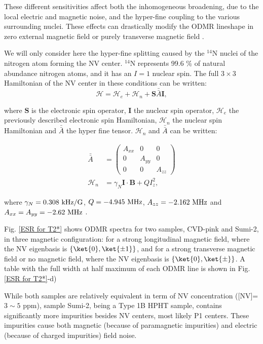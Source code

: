 \documentclass[a4paper,11pt]{report}
\begin{document}
These different sensitivities affect both the inhomogeneous broadening, due to the local electric and magnetic noise, and the hyper-fine coupling to the various surrounding nuclei. These effects can drastically modify the ODMR lineshape in zero external magnetic field \citep{jamonneau2016competition} or purely transverse magnetic field \citep{qiu2021nuclear,qiu2022nanoscale}.

We will only consider here the hyper-fine splitting caused by the $^{14}$N nuclei of the nitrogen atom forming the NV center. $^{14}$N represents 99.6 \% of natural abundance nitrogen atoms, and it has an $I=1$ nuclear spin. The full $3\times 3$ Hamiltonian of the NV center in these conditions can be written:
\begin{equation}
\mathcal{H}=\mathcal{H}_e + \mathcal{H}_n + \mathbf{S} \bar{\bar{A}} \mathbf{I},
\end{equation}

where $\mathbf{S}$ is the electronic spin operator, $\mathbf{I}$ the nuclear spin operator, $\mathcal{H}_e$ the previously described electronic spin Hamiltonian, $\mathcal{H}_n$ the nuclear spin Hamiltonian and $\bar{\bar{A}}$ the hyper fine tensor. $\mathcal{H}_n$ and $\bar{\bar{A}}$ can be written:

\begin{align}
\bar{\bar{A}} &= \begin{pmatrix}
A_{xx} & 0 & 0 \\
0 & A_{yy} & 0 \\
0 & 0 & A_{zz}
\end{pmatrix} \\
\mathcal{H}_n &= \gamma_N \mathbf{I} \cdot \mathbf{B} + Q I_z^2,
\end{align}

where $\gamma_N=0.308\ \rm kHz/G$, $Q=-4.945\ \rm MHz$, $A_{zz}=-2.162\ \rm MHz$ and $A_{xx}=A_{yy}=-2.62\ \rm MHz$ \citep{smeltzer2009robust}.

Fig. \ref{ESR for T2*} shows ODMR spectra for two samples, CVD-pink and Sumi-2, in three magnetic configuration: for a strong longitudinal magnetic field, where the NV eigenbasis is $\{ \ket{0}, \ket{\pm 1} \}$, and for a strong transverse magnetic field or no magnetic field, where the NV eigenbasis is $\{ \ket{0}, \ket{\pm} \}$. A table with the full width at half maximum of each ODMR line is shown in Fig. \ref{ESR for T2*}-d)

While both samples are relatively equivalent in term of NV concentration ([NV]=$3 \sim 5$ ppm), sample Sumi-2, being a Type 1B HPHT sample, contains significantly more impurities besides NV centers, most likely P1 centers. These impurities cause both magnetic (because of paramagnetic impurities) and electric (because of charged impurities) field noise.
\end{document}
